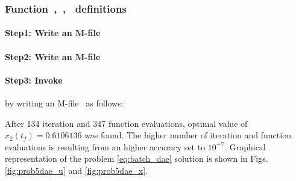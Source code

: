 \subsubsection{Function~,~,~  definitions}
\label{sec:example-fundef}

\paragraph{Step1: Write an M-file~}

{\small }

\paragraph{Step2: Write an M-file~}

{\small }

\paragraph{Step3: Invoke~} by writing an
M-file~ as follows:

{\small }

After 134 iteration and 347 function evaluations, optimal value of
$x_{2}(t_{f}) = 0.6106136$ was found. The higher number of iteration
and function evaluations is resulting from an higher accuracy set to
$10^{-7}$. Graphical representation of the problem
\eqref{eq:batch_dae} solution is shown in Figs. \ref{fig:prob5dae_u}
and \ref{fig:prob5dae_x}. 


